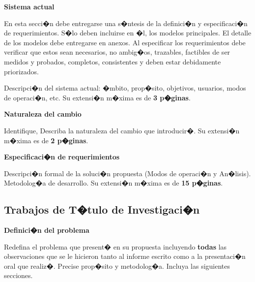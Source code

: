 \documentclass[12pt,a4paper]{article}
\begin{document}
\vspace{1mm}

\large{\textbf{Sistema actual}}

\vspace{1mm}

\normalsize

En esta secci�n debe entregarse una s�ntesis de la definici�n y especificaci�n de requerimientos. S�lo deben incluirse en �l, los modelos principales. El detalle de los modelos debe entregarse en anexos. Al especificar los requerimientos debe verificar que estos sean necesarios, no ambig�os, trazables, factibles de ser medidos y probados, completos, consistentes y deben estar debidamente priorizados.

Descripci�n del sistema actual: �mbito, prop�sito, objetivos, usuarios, modos de operaci�n, etc. Su extensi�n m�xima es de \textbf{3 p�ginas}.

\large{\textbf{Naturaleza del cambio}}

\vspace{1mm}

\normalsize

Identifique, Describa la naturaleza del cambio que introducir�. Su extensi�n
m�xima es de \textbf{2 p�ginas}.

\vspace{1mm}

\large{\textbf{Especificaci�n de requerimientos}}

\vspace{1mm}

\normalsize

Descripci�n formal de la soluci�n propuesta (Modos de operaci�n y  An�lisis). Metodolog�a de desarrollo.  Su extensi�n m�xima es de \textbf{15 p�ginas}.


\subsection{Trabajos de T�tulo de Investigaci�n}
\large{\textbf{Definici�n del problema}}

\vspace{1mm}

\normalsize

Redefina el problema que present� en su propuesta incluyendo
\textbf{todas} las observaciones que se le hicieron tanto al informe
escrito como a la presentaci�n oral que realiz�. Precise prop�sito y
metodolog�a. Incluya las siguientes secciones.

\vspace{1mm}
\end{document}
